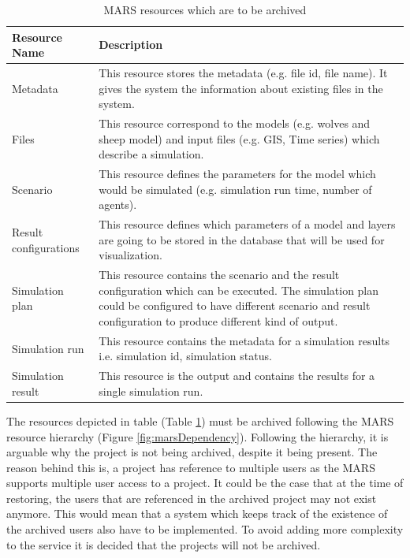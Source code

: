         \begin{table}[H]
            \centering
            \begin{tabular}{|p{3cm}|p{12cm}|}
                \hline
                    \textbf{Resource Name}  & \textbf{Description}\\
                \hline
                     Metadata & 
                     This resource stores the metadata (e.g. file id, file name). It gives the system the information about
                     existing files in the system. \\
                \hline
                     Files & 
                     This resource correspond to the models (e.g. wolves and sheep model) and input files (e.g. GIS, Time series) which describe a simulation. \\
                \hline
                     Scenario & 
                     This resource defines the parameters for the model which would be simulated (e.g. simulation run time, number of agents). \\
                \hline
                     Result configurations & 
                     This resource defines which parameters of a model and layers are going to be stored in the database that will be used for visualization.\\
                \hline
                     Simulation plan & 
                     This resource contains the scenario and the result configuration which can be executed. The simulation plan could be configured to
                     have different scenario and result configuration to produce different kind of output.\\
                \hline
                     Simulation run & 
                     This resource contains the metadata for a simulation results i.e. simulation id, simulation status.\\
                \hline
                     Simulation result & 
                     This resource is the output and contains the results for a single simulation run.\\
                \hline
            \end{tabular}
            \caption{MARS resources which are to be archived}
            \label{table: archivedMars}     
        \end{table} 

        The resources depicted in table (Table \ref{table: archivedMars}) must be archived following the MARS resource hierarchy (Figure \ref{fig:marsDependency}).
        Following the hierarchy, it is arguable why the project is not being archived, despite it being present. The reason behind this is, a project has reference
        to multiple users as the MARS supports multiple user access to a project. It could be the case that at the time of restoring, the users that are referenced 
        in the archived project may not exist anymore.
        This would mean that a system which keeps track of the 
        existence of the archived users also have to be implemented. To avoid adding more complexity to the service it is decided that the projects will not be archived.
        
